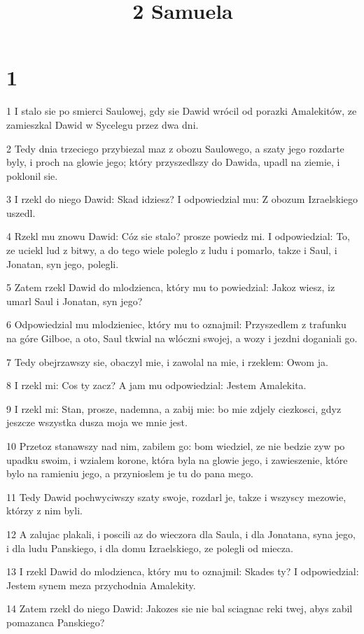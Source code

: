 

\title{2 Samuela}


\chapter{1}

\par 1 I stalo sie po smierci Saulowej, gdy sie Dawid wrócil od porazki Amalekitów, ze zamieszkal Dawid w Sycelegu przez dwa dni.
\par 2 Tedy dnia trzeciego przybiezal maz z obozu Saulowego, a szaty jego rozdarte byly, i proch na glowie jego; który przyszedlszy do Dawida, upadl na ziemie, i poklonil sie.
\par 3 I rzekl do niego Dawid: Skad idziesz? I odpowiedzial mu: Z obozum Izraelskiego uszedl.
\par 4 Rzekl mu znowu Dawid: Cóz sie stalo? prosze powiedz mi. I odpowiedzial: To, ze uciekl lud z bitwy, a do tego wiele poleglo z ludu i pomarlo, takze i Saul, i Jonatan, syn jego, polegli.
\par 5 Zatem rzekl Dawid do mlodzienca, który mu to powiedzial: Jakoz wiesz, iz umarl Saul i Jonatan, syn jego?
\par 6 Odpowiedzial mu mlodzieniec, który mu to oznajmil: Przyszedlem z trafunku na góre Gilboe, a oto, Saul tkwial na wlóczni swojej, a wozy i jezdni doganiali go.
\par 7 Tedy obejrzawszy sie, obaczyl mie, i zawolal na mie, i rzeklem: Owom ja.
\par 8 I rzekl mi: Cos ty zacz? A jam mu odpowiedzial: Jestem Amalekita.
\par 9 I rzekl mi: Stan, prosze, nademna, a zabij mie: bo mie zdjely ciezkosci, gdyz jeszcze wszystka dusza moja we mnie jest.
\par 10 Przetoz stanawszy nad nim, zabilem go: bom wiedziel, ze nie bedzie zyw po upadku swoim, i wzialem korone, która byla na glowie jego, i zawieszenie, które bylo na ramieniu jego, a przynioslem je tu do pana mego.
\par 11 Tedy Dawid pochwyciwszy szaty swoje, rozdarl je, takze i wszyscy mezowie, którzy z nim byli.
\par 12 A zalujac plakali, i poscili az do wieczora dla Saula, i dla Jonatana, syna jego, i dla ludu Panskiego, i dla domu Izraelskiego, ze polegli od miecza.
\par 13 I rzekl Dawid do mlodzienca, który mu to oznajmil: Skades ty? I odpowiedzial: Jestem synem meza przychodnia Amalekity.
\par 14 Zatem rzekl do niego Dawid: Jakozes sie nie bal sciagnac reki twej, abys zabil pomazanca Panskiego?
